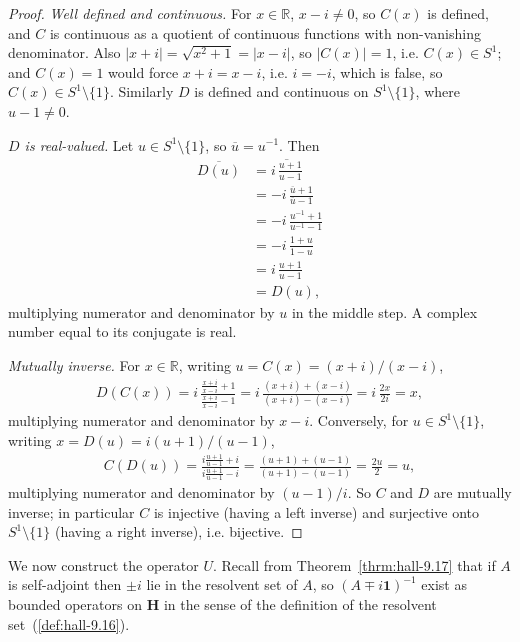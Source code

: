 \begin{proof}
\leanok
\textit{Well defined and continuous.} For $x \in \mathbb{R}$, $x - i \ne 0$, so $C(x)$ is defined, and $C$ is continuous as a quotient of continuous functions with non-vanishing denominator. Also $\lvert x+i \rvert = \sqrt{x^2+1} = \lvert x-i \rvert$, so $\lvert C(x) \rvert = 1$, i.e. $C(x) \in S^1$; and $C(x) = 1$ would force $x+i = x-i$, i.e. $i = -i$, which is false, so $C(x) \in S^1\setminus\{1\}$. Similarly $D$ is defined and continuous on $S^1\setminus\{1\}$, where $u - 1 \ne 0$.

\textit{$D$ is real-valued.} Let $u \in S^1\setminus\{1\}$, so $\overline u = u^{-1}$. Then
\begin{align}
    \overline{D(u)} &= \overline{i\,\frac{u+1}{u-1}} \\
                &= -i\,\frac{\overline u + 1}{\overline u - 1} \\
                &= -i\,\frac{u^{-1}+1}{u^{-1}-1} \\
                &= -i\,\frac{1 + u}{1 - u} \\
                &= i\,\frac{u+1}{u-1} \\
                &= D(u),
\end{align}
multiplying numerator and denominator by $u$ in the middle step. A complex number equal to its conjugate is real.

\textit{Mutually inverse.} For $x \in \mathbb{R}$, writing $u = C(x) = (x+i)/(x-i)$,
\begin{align}
    D(C(x)) = i\,\frac{\frac{x+i}{x-i} + 1}{\frac{x+i}{x-i} - 1} = i\,\frac{(x+i)+(x-i)}{(x+i)-(x-i)} = i\,\frac{2x}{2i} = x,
\end{align}
multiplying numerator and denominator by $x-i$. Conversely, for $u \in S^1\setminus\{1\}$, writing $x = D(u) = i(u+1)/(u-1)$,
\begin{align}
    C(D(u)) = \frac{i\frac{u+1}{u-1} + i}{i\frac{u+1}{u-1} - i} = \frac{(u+1)+(u-1)}{(u+1)-(u-1)} = \frac{2u}{2} = u,
\end{align}
multiplying numerator and denominator by $(u-1)/i$. So $C$ and $D$ are mutually inverse; in particular $C$ is injective (having a left inverse) and surjective onto $S^1\setminus\{1\}$ (having a right inverse), i.e. bijective.
\end{proof}

We now construct the operator $U$. Recall from Theorem~\ref{thrm:hall-9.17} that if $A$ is self-adjoint then $\pm i$ lie in the resolvent set of $A$, so $(A \mp i\mathbf{1})^{-1}$ exist as bounded operators on $\mathbf{H}$ in the sense of the definition of the resolvent set~(\ref{def:hall-9.16}).

